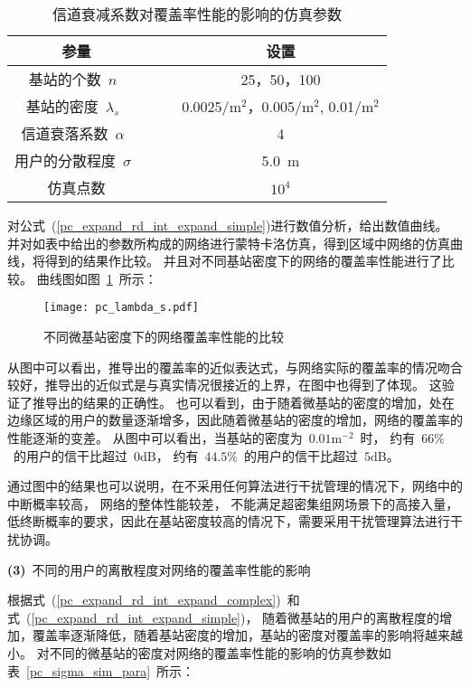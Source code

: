 \begin{table}[htbp]
\caption{信道衰减系数对覆盖率性能的影响的仿真参数}
\label{pc_lambda_s_sim_para}
\vspace{0.5em}\centering\wuhao
\begin{tabular}{cccc}
\toprule[1.5pt]
参量 & & & 设置 \\
\midrule[0.5pt]
基站的个数~$n$~ & & &  25，50，100\\
基站的密度~$\lambda_s$~ & & &  0.0025/${\mathrm{m}^2}$，0.005/${\mathrm{m}^2}$, 0.01/${\mathrm{m}^2}$\\
信道衰落系数~$\alpha$~  & & &  4\\
用户的分散程度~$\sigma$~ & & & 5.0~$\mathrm{m}$ \\
仿真点数 & & & $10^{4}$ \\
\bottomrule[1.5pt]
\end{tabular}
\end{table}

对公式~(\ref{pc_expand_rd_int_expand_simple})进行数值分析，给出数值曲线。
并对如表中给出的参数所构成的网络进行蒙特卡洛仿真，得到区域中网络的仿真曲线，将得到的结果作比较。
并且对不同基站密度下的网络的覆盖率性能进行了比较。
曲线图如图~\ref{pc_lambda_s_graph}~所示：
\begin{figure}[htbp]
\centering
\texttt{[image: pc\_lambda\_s.pdf]}
\caption{不同微基站密度下的网络覆盖率性能的比较}\vspace{-0.5em}
\label{pc_lambda_s_graph}
\end{figure}
从图中可以看出，推导出的覆盖率的近似表达式，与网络实际的覆盖率的情况吻合较好，推导出的近似式是与真实情况很接近的上界，在图中也得到了体现。
这验证了推导出的结果的正确性。
也可以看到，由于随着微基站的密度的增加，处在边缘区域的用户的数量逐渐增多，因此随着微基站的密度的增加，网络的覆盖率的性能逐渐的变差。
从图中可以看出，当基站的密度为~$0.01\mathrm{m}^{-2}$~时，
约有~$66\%$~的用户的信干比超过~$0\mathrm{dB}$，
约有~$44.5\%$~的用户的信干比超过~$5\mathrm{dB}$。

通过图中的结果也可以说明，在不采用任何算法进行干扰管理的情况下，网络中的中断概率较高，
网络的整体性能较差，
不能满足超密集组网场景下的高接入量，低终断概率的要求，因此在基站密度较高的情况下，需要采用干扰管理算法进行干扰协调。

\textbf{(3)}~不同的用户的离散程度对网络的覆盖率性能的影响

根据式~(\ref{pc_expand_rd_int_expand_complex})~和式~(\ref{pc_expand_rd_int_expand_simple})，
随着微基站的用户的离散程度的增加，覆盖率逐渐降低，随着基站密度的增加，基站的密度对覆盖率的影响将越来越小。
对不同的微基站的密度对网络的覆盖率性能的影响的仿真参数如表~\ref{pc_sigma_sim_para}~所示：

